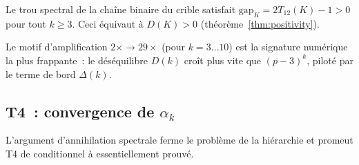 \documentclass[12pt,a4paper]{article}
\begin{document}
\begin{lemme}
\label{lem:dominance}
Le trou spectral de la chaîne binaire du crible satisfait
$\mathrm{gap}_K = 2T_{12}(K) - 1 > 0$ pour tout $k \geq 3$.
Ceci équivaut à $D(K) > 0$ (théorème~\ref{thm:positivity}).
\end{lemme}

Le motif d'amplification $2\times \to 29\times$ (pour $k = 3\ldots 10$)
est la signature numérique la plus frappante~: le déséquilibre $D(k)$
croît plus vite que $(p-3)^k$, piloté par le terme de bord $\Delta(k)$.

\subsection{T4~: convergence de $\alpha_k$}
\label{sec:ch7_T4}

L'argument d'annihilation spectrale ferme le problème de la hiérarchie
et promeut T4 de conditionnel à essentiellement prouvé.
\end{document}
